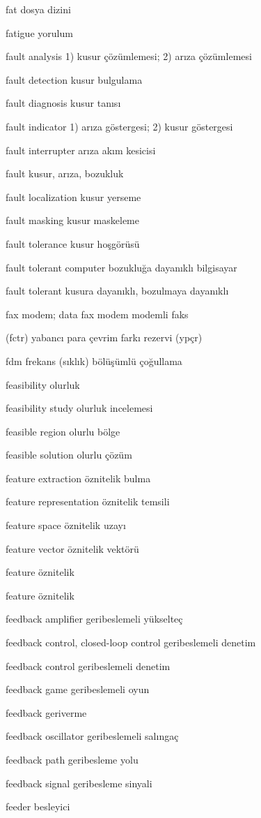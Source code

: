 \documentclass[12pt,fleqn]{article}\usepackage{../../common}
\begin{document}
fat dosya dizini

fatigue yorulum

fault analysis 1) kusur çözümlemesi; 2) arıza çözümlemesi

fault detection kusur bulgulama

fault diagnosis kusur tanısı

fault indicator 1) arıza göstergesi; 2) kusur göstergesi

fault interrupter arıza akım kesicisi

fault kusur, arıza, bozukluk

fault localization kusur yerseme

fault masking kusur maskeleme

fault tolerance kusur hoşgörüsü

fault tolerant computer bozukluğa dayanıklı bilgisayar

fault tolerant kusura dayanıklı, bozulmaya dayanıklı

fax modem; data fax modem modemli faks

(fctr) yabancı para çevrim farkı rezervi (ypçr)

fdm frekans (sıklık) bölüşümlü çoğullama

feasibility olurluk

feasibility study olurluk incelemesi

feasible region olurlu bölge

feasible solution olurlu çözüm

feature extraction öznitelik bulma

feature representation öznitelik temsili

feature space öznitelik uzayı

feature vector öznitelik vektörü

feature öznitelik

feature öznitelik

feedback amplifier geribeslemeli yükselteç

feedback control, closed-loop control geribeslemeli denetim

feedback control geribeslemeli denetim

feedback game geribeslemeli oyun

feedback geriverme

feedback oscillator geribeslemeli salıngaç

feedback path geribesleme yolu

feedback signal geribesleme sinyali

feeder besleyici
\end{document}
